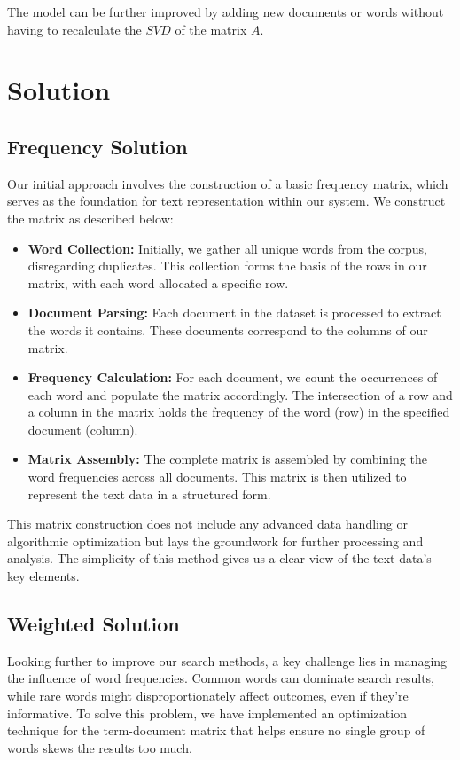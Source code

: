 \documentclass[12pt,a4paper]{article}
\begin{document}
\bigskip
\noindent The model can be further improved by adding new documents or words without having to recalculate the $SVD$ of the matrix $A$.

\newpage
\section{Solution}

\subsection{Frequency Solution}

Our initial approach involves the construction of a basic frequency matrix, which serves as the foundation for text representation within our system. We construct the matrix as described below:

\begin{itemize}
    \item \textbf{Word Collection:} Initially, we gather all unique words from the corpus, disregarding duplicates. This collection forms the basis of the rows in our matrix, with each word allocated a specific row.
    \item \textbf{Document Parsing:} Each document in the dataset is processed to extract the words it contains. These documents correspond to the columns of our matrix.
    \item \textbf{Frequency Calculation:} For each document, we count the occurrences of each word and populate the matrix accordingly. The intersection of a row and a column in the matrix holds the frequency of the word (row) in the specified document (column).
    \item \textbf{Matrix Assembly:} The complete matrix is assembled by combining the word frequencies across all documents. This matrix is then utilized to represent the text data in a structured form.
\end{itemize}

\noindent This matrix construction does not include any advanced data handling or algorithmic optimization but lays the groundwork for further processing and analysis. The simplicity of this method gives us a clear view of the text data's key elements.


\subsection{Weighted Solution}

Looking further to improve our search methods, a key challenge lies in managing the influence of word frequencies. Common words can dominate search results, while rare words might disproportionately affect outcomes, even if they're informative. To solve this problem, we have implemented an optimization technique for the term-document matrix that helps ensure no single group of words skews the results too much.
\end{document}

